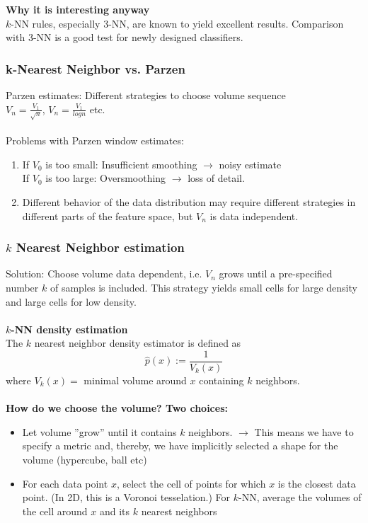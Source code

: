 \documentclass[main]{subfiles}
\begin{document}
\textbf{Why it is interesting anyway}\\
 $k$-NN rules, especially 3-NN, are
known to yield excellent results. Comparison with
3-NN is a good test for newly designed classifiers.



\subsubsection{k-Nearest Neighbor vs. Parzen}
Parzen estimates: Different strategies to choose volume
sequence\\
$V_n=\frac{V_1}{\sqrt{n}}$,\; $V_n=\frac{V_1}{log n}$ \;etc.\\\\
Problems with Parzen window estimates:
\begin{enumerate}
\item  If $V_0$ is too small: Insufficient smoothing $\to$ noisy estimate\\
If $V_0$ is too large: Oversmoothing $\to$ loss of detail.
\item Different behavior of the data distribution may
require different strategies in different parts of
the feature space, but $V_n$ is data independent.
\end{enumerate}

\subsubsection{$k$ Nearest Neighbor estimation}
Solution:  Choose volume data dependent, i.e. $V_n$ grows until
a pre-specified number $k$ of samples is included.
This strategy yields small cells for large density
and large cells for low density.\\\\
\textbf{$k$-NN density estimation}\\
The $k$ nearest neighbor density estimator is defined as
\begin{equation}
\hat{p}(x):=\frac{1}{V_k(x)}
\end{equation}
where $V_k (x) =$ minimal volume around $x$
containing $k$ neighbors.\\\\
\textbf{How do we choose the volume? Two choices:}\\
\begin{itemize}
\item Let volume ”grow” until it contains $k$ neighbors.
$\to$ This means we have to specify a metric
and, thereby, we have implicitly selected a
shape for the volume (hypercube, ball etc)
\item For each data point $x$, select the cell of points
for which $x$ is the closest data point. (In 2D,
this is a Voronoi tesselation.) For $k$-NN,
average the volumes of the cell around $x$ and
its $k$ nearest neighbors

\end{itemize}
\end{document}
